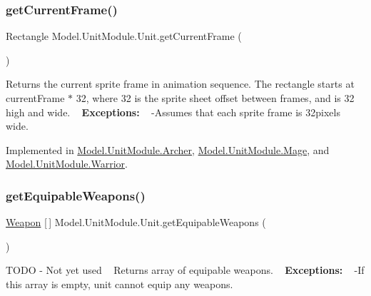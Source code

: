 \subsubsection{\texorpdfstring{get\+Current\+Frame()}{getCurrentFrame()}}
{\footnotesize\ttfamily Rectangle Model.\+Unit\+Module.\+Unit.\+get\+Current\+Frame (\begin{DoxyParamCaption}{ }\end{DoxyParamCaption})}

Returns the current sprite frame in animation sequence. The rectangle starts at current\+Frame $\ast$ 32, where 32 is the sprite sheet offset between frames, and is 32 high and wide. ~\newline
 {\bfseries Exceptions\+:} ~\newline
 -\/\+Assumes that each sprite frame is 32pixels wide. 

Implemented in \hyperlink{class_model_1_1_unit_module_1_1_archer_ac116699a7276c0549d2be5c3998d8813}{Model.\+Unit\+Module.\+Archer}, \hyperlink{class_model_1_1_unit_module_1_1_mage_a66ef058e38d7220bc65604504eb25bce}{Model.\+Unit\+Module.\+Mage}, and \hyperlink{class_model_1_1_unit_module_1_1_warrior_ab6a358a386cb1a55b619b8517b084ef7}{Model.\+Unit\+Module.\+Warrior}.

\hypertarget{interface_model_1_1_unit_module_1_1_unit_a7b64e60f28d516a5fb4e28a9b7cd8eec}{}\label{interface_model_1_1_unit_module_1_1_unit_a7b64e60f28d516a5fb4e28a9b7cd8eec} 
\subsubsection{\texorpdfstring{get\+Equipable\+Weapons()}{getEquipableWeapons()}}
{\footnotesize\ttfamily \hyperlink{interface_model_1_1_weapon_module_1_1_weapon}{Weapon} \mbox{[}$\,$\mbox{]} Model.\+Unit\+Module.\+Unit.\+get\+Equipable\+Weapons (\begin{DoxyParamCaption}{ }\end{DoxyParamCaption})}

T\+O\+DO -\/ Not yet used ~\newline
Returns array of equipable weapons. ~\newline
 {\bfseries Exceptions\+:} ~\newline
 -\/\+If this array is empty, unit cannot equip any weapons. 

